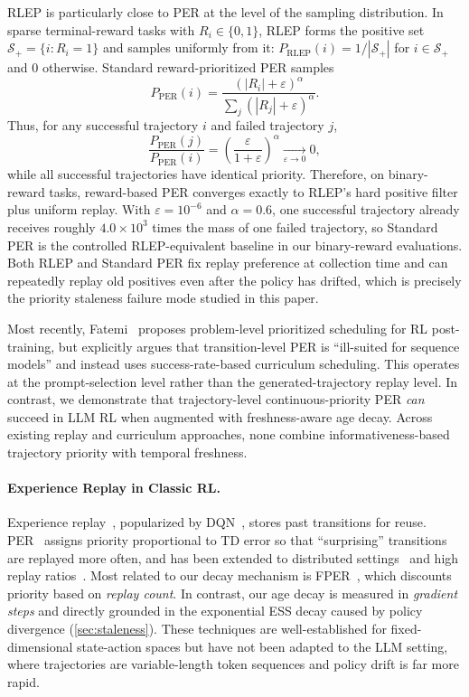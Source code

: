 \documentclass[runningheads]{llncs}
\begin{document}
RLEP is particularly close to PER at the level of the sampling distribution. In sparse terminal-reward tasks with $R_i\in\{0,1\}$, RLEP forms the positive set $\mathcal{S}_+=\{i:R_i=1\}$ and samples uniformly from it:
$P_{\mathrm{RLEP}}(i)=1/|\mathcal{S}_+|$ for $i\in\mathcal{S}_+$ and $0$ otherwise. Standard reward-prioritized PER samples
\begin{equation*}
P_{\mathrm{PER}}(i)=
\frac{(|R_i|+\varepsilon)^\alpha}
{\sum_j(|R_j|+\varepsilon)^\alpha}.
\end{equation*}
Thus, for any successful trajectory $i$ and failed trajectory $j$,
\begin{equation*}
\frac{P_{\mathrm{PER}}(j)}{P_{\mathrm{PER}}(i)}
=\left(\frac{\varepsilon}{1+\varepsilon}\right)^\alpha
\xrightarrow[\varepsilon\to0]{}0,
\end{equation*}
while all successful trajectories have identical priority. Therefore, on binary-reward tasks, reward-based PER converges exactly to RLEP's hard positive filter plus uniform replay. With $\varepsilon=10^{-6}$ and $\alpha=0.6$, one successful trajectory already receives roughly $4.0{\times}10^3$ times the mass of one failed trajectory, so Standard PER is the controlled RLEP-equivalent baseline in our binary-reward evaluations. Both RLEP and Standard PER fix replay preference at collection time and can repeatedly replay old positives even after the policy has drifted, which is precisely the priority staleness failure mode studied in this paper.

Most recently, Fatemi~\cite{fatemi2026prioritized} proposes problem-level prioritized scheduling for RL post-training, but explicitly argues that transition-level PER is ``ill-suited for sequence models'' and instead uses success-rate-based curriculum scheduling. This operates at the prompt-selection level rather than the generated-trajectory replay level. In contrast, we demonstrate that trajectory-level continuous-priority PER \emph{can} succeed in LLM RL when augmented with freshness-aware age decay. Across existing replay and curriculum approaches, none combine informativeness-based trajectory priority with temporal freshness.

\paragraph{Experience Replay in Classic RL.}
Experience replay~\cite{lin1992self}, popularized by DQN~\cite{mnih2015human}, stores past transitions for reuse. PER~\cite{schaul2016per} assigns priority proportional to TD error so that ``surprising'' transitions are replayed more often, and has been extended to distributed settings~\cite{horgan2018distributed} and high replay ratios~\cite{doro2023sampleefficient,schwarzer2023bbf,fedus2020revisiting}. Most related to our decay mechanism is FPER~\cite{ma2022fper}, which discounts priority based on \emph{replay count}. In contrast, our age decay is measured in \emph{gradient steps} and directly grounded in the exponential ESS decay caused by policy divergence (\cref{sec:staleness}). These techniques are well-established for fixed-dimensional state-action spaces but have not been adapted to the LLM setting, where trajectories are variable-length token sequences and policy drift is far more rapid.
\end{document}
